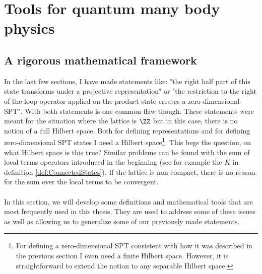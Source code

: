 \chapter{Tools for quantum many body physics}\label{ch:Tools_For_Quantum_many_Body}

\section{A rigorous mathematical framework}
\label{sec:ToolsForQuantumManyBody}
In the last few sections, I have made statements like: "the right half part of this state transforms under a projective representation" or "the restriction to the right of the loop operator applied on the product state creates a zero-dimensional SPT". With both statements is one common flaw though. These statements were meant for the situation where the lattice is $\ZZ$ but in this case, there is no notion of a full Hilbert space. Both for defining representations and for defining zero-dimensional SPT states I need a Hilbert space\footnote{For defining a zero-dimensional SPT consistent with how it was described in the previous section I even need a finite Hilbert space. However, it is straightforward to extend the notion to any separable Hilbert space.}. This begs the question, on what Hilbert space is this true? Similar problems can be found with the sum of local terms operators introduced in the beginning (see for example the $K$ in definition \ref{def:ConnectedStates}). If the lattice is non-compact, there is no reason for the sum over the local terms to be convergent.\\\\
In this section, we will develop some definitions and mathematical tools that are most frequently used in this thesis. They are used to address some of these issues as well as allowing us to generalize some of our previously made statements.
